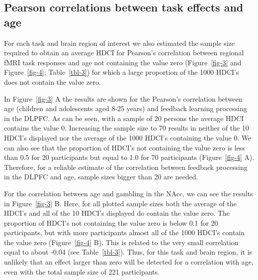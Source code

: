 \documentclass[
  letterpaper,
  DIV=11,
  numbers=noendperiod]{scrartcl}
\begin{document}
\subsection{Pearson correlations between task effects and
age}\label{pearson-correlations-between-task-effects-and-age}

For each task and brain region of interest we also estimated the sample
size required to obtain an average HDCI for Pearson's correlation
between regional fMRI task responses and age not containing the value
zero (Figure~\ref{fig-3} and Figure~\ref{fig-4}; Table~\ref{tbl-3}) for
which a large proportion of the 1000 HDCI's does not contain the value
zero.

In Figure~\ref{fig-3} A the results are shown for the Pearson's
correlation between age (children and adolescents aged 8-25 years) and
feedback learning processing in the DLPFC. As can be seen, with a sample
of 20 persons the average HDCI contains the value 0. Increasing the
sample size to 70 results in neither of the 10 HDCI's displayed nor the
average of the 1000 HDCI's containing the value 0. We can also see that
the proportion of HDCI's not containing the value zero is less than 0.5
for 20 participants but equal to 1.0 for 70 participants
(Figure~\ref{fig-4} A). Therefore, for a reliable estimate of the
correlation between feedback processing in the DLPFC and age, sample
sizes bigger than 20 are needed.

For the correlation between age and gambling in the NAcc, we can see the
results in Figure~\ref{fig-3} B. Here, for all plotted sample sizes both
the average of the HDCI's and all of the 10 HDCI's displayed do contain
the value zero. The proportion of HDCI's not containing the value zero
is below 0.1 for 20 participants, but with more participants almost all
of the 1000 HDCI's contain the value zero (Figure~\ref{fig-4} B). This
is related to the very small correlation equal to about -0.04 (see
Table~\ref{tbl-3}). Thus, for this task and brain region, it is unlikely
that an effect larger than zero will be detected for a correlation with
age, even with the total sample size of 221 participants.
\end{document}
